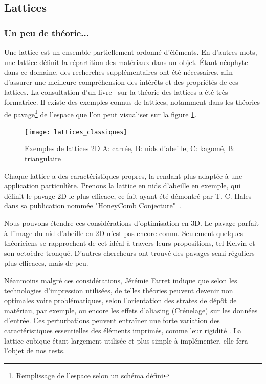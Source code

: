 \documentclass{tnreport}
\begin{document}
\subsection{Lattices}\label{subsec:lattices}
\subsubsection{Un peu de théorie...}
Une lattice est un ensemble partiellement ordonné d'éléments. En d'autres mots, une lattice définit la répartition des matériaux dans un objet. Étant néophyte dans ce domaine, des recherches supplémentaires ont été nécessaires, afin d'assurer une meilleure compréhension des intérêts et des propriétés de ces lattices. La consultation d'un livre~\cite{latticesbook} sur la théorie des lattices a été très formatrice. Il existe des exemples connus de lattices, notamment dans les théories de pavage\footnote{Remplissage de l'espace selon un schéma défini} de l'espace que l'on peut visualiser sur la figure \ref{fig:lattices_classiques}.
\begin{figure}[h]
  \centering
  \texttt{[image: lattices\_classiques]}
  \caption{Exemples de lattices 2D A: carrée, B: nids d'abeille, C: kagomé, B: triangulaire}
  \label{fig:lattices_classiques}
\end{figure}
 Chaque lattice a des caractéristiques propres, la rendant plus adaptée à une application particulière. Prenons la lattice en nids d'abeille en exemple, qui définit le pavage 2D le plus efficace, ce fait ayant été démontré par T. C. Hales dans sa publication nommée "HoneyComb Conjecture"~\cite{hales2001honeycomb}.

Nous pouvons étendre ces considérations d'optimisation en 3D. Le pavage parfait à l'image du nid d'abeille en 2D n'est pas encore connu. Seulement quelques théoriciens se rapprochent de cet idéal à travers leurs propositions, tel Kelvin et son octoèdre tronqué. D'autres chercheurs ont trouvé des pavages semi-réguliers plus efficaces, mais de peu. 

Néanmoins malgré ces considérations, Jérémie Farret indique que selon les technologies d'impression utilisées, de telles théories peuvent devenir non optimales voire problématiques, selon l'orientation des strates de dépôt de matériau, par exemple, ou encore les effets d'aliasing (Crénelage) sur les données d'entrée. Ces perturbations peuvent entraîner une forte variation des caractéristiques essentielles des éléments imprimés, comme leur rigidité . La lattice cubique étant largement utilisée et plus simple à implémenter, elle fera l'objet de nos tests.
\\
\end{document}
